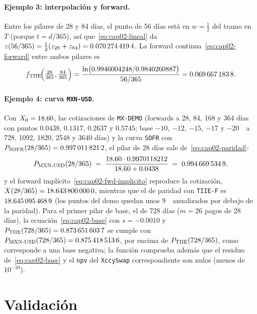 \paragraph{Ejemplo 3: interpolación y forward.}
Entre los pilares de 28 y 84 días, el punto de 56 días está en $w=\tfrac12$ del tramo en $T$ (porque
$t=d/365$), así que~\eqref{eq:cap02-lineal} da $z(56/365) = \tfrac12(z_{28}+z_{84}) =
\verif{cap02-tiie-zero-56}{0.0702744194}$. La forward continua~\eqref{eq:cap02-forward} entre ambos pilares es
\[
  f_{\cTIIE}\!\Bigl(\tfrac{28}{365},\tfrac{84}{365}\Bigr) =
  \frac{\ln\bigl(0.9946004248/0.9840260887\bigr)}{56/365} = \verif{cap02-tiie-fwd-28-84}{0.0696671838}.
\]

\paragraph{Ejemplo 4: curva \texttt{MXN-USD}.}
Con $\Spot=18.60$, las cotizaciones de \texttt{MX-DEMO} (forwards a 28, 84, 168 y 364 días con puntos
$0.0438$, $0.1317$, $0.2637$ y $0.5745$; base $-10$, $-12$, $-15$, $-17$ y $-20$~\pb\ a 728, 1092, 1820, 2548 y
3640 días) y la curva \texttt{SOFR} con $\DF{\cSOFR}{28/365} = \verif{cap02-sofr-df-28}{0.9970118212}$, el pilar de
28 días sale de~\eqref{eq:cap02-paridad}:
\[
  \DF{\cMXNcol}{28/365} \;=\; \frac{18.60\cdot 0.9970118212}{18.60+0.0438} \;=\; \verif{cap02-mxnusd-df-28}{0.9946695349},
\]
y el forward implícito~\eqref{eq:cap02-fwd-implicito} reproduce la cotización,
$\FxF{28/365} = \verif{cap02-fwd-implicito-28}{18.6438000000}$, mientras que el de paridad con \texttt{TIIE-F}
es $\verif{cap02-fwd-paridad-28}{18.6450954689}$ (los puntos del demo quedan unos 9~\pb\ anualizados por debajo de la
paridad). Para el primer pilar de base, el de 728 días ($m=26$ pagos de 28 días), la
ecuación~\eqref{eq:cap02-base} con $s=-0.0010$ y $\DF{\cTIIE}{728/365} = \verif{cap02-tiie-df-728}{0.8736516037}$
se cumple con $\DF{\cMXNcol}{728/365} = \verif{cap02-mxnusd-df-728}{0.8754185136}$, por encima de
$\DF{\cTIIE}{728/365}$, como corresponde a una base negativa; la función
 comprueba además que el residuo de~\eqref{eq:cap02-base}
y el \texttt{npv} del \texttt{XccySwap} correspondiente son nulos (menos de $10^{-10}$).

\section{Validación}\label{sec:cap02-validacion}

